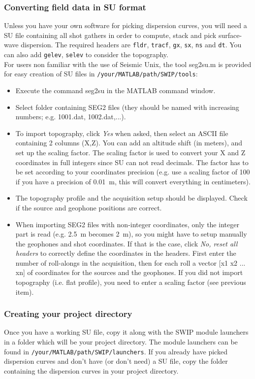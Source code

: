 \documentclass[twoside,a4paper]{article}
\begin{document}
\subsubsection{Converting field data in SU format}
\label{sec:seg2su}
Unless you have your own software for picking dispersion curves, you will need a SU file containing all shot gathers in order to compute, stack and pick surface-wave dispersion. The required headers are \verb|fldr|, \verb|tracf|, \verb|gx|, \verb|sx|, \verb|ns| and \verb|dt|. You can also add \verb|gelev|, \verb|selev| to consider the topography.\\[2ex]
For users non familiar with the use of Seismic Unix, the tool seg2su.m is provided for easy creation of SU files in \verb|/your/MATLAB/path/SWIP/tools|:

\begin{itemize}
\setlength\itemsep{2ex}
\setlength{\parindent}{5ex}
\item Execute the command seg2su in the MATLAB command window.
\item Select folder containing SEG2 files (they should be named with increasing numbers; e.g. 1001.dat, 1002.dat,...).
\item To import topography, click \textit{Yes} when asked, then select an ASCII file containing 2 columns (X,Z). You can add an altitude shift (in meters), and set up the scaling factor. The scaling factor is used to convert your X and Z coordinates in full integers since SU can not read decimals. The factor has to be set according to your coordinates precision (e.g. use a scaling factor of 100 if you have a precision of 0.01~m, this will convert everything in centimeters).
\item The topography profile and the acquisition setup should be displayed. Check if the source and geophone positions are correct.
\item When importing SEG2 files with non-integer coordinates, only the integer part is read (e.g. 2.5~m becomes 2~m), so you might have to setup manually the geophones and shot coordinates. If that is the case, click \textit{No, reset all headers} to correctly define the coordinates in the headers. First enter the number of roll-alongs in the acquisition, then for each roll a vector [x1 x2 ... xn] of coordinates for the sources and the geophones. If you did not import topography (i.e. flat profile), you need to enter a scaling factor (see previous item).
\end{itemize}

\subsubsection{Creating your project directory}
Once you have a working SU file, copy it along with the SWIP module launchers in a folder which will be your project directory. The module launchers can be found in \verb|/your/MATLAB/path/SWIP/launchers|. If you already have picked dispersion curves and don't have (or don't need) a SU file, copy the folder containing the dispersion curves in your project directory.
\end{document}
